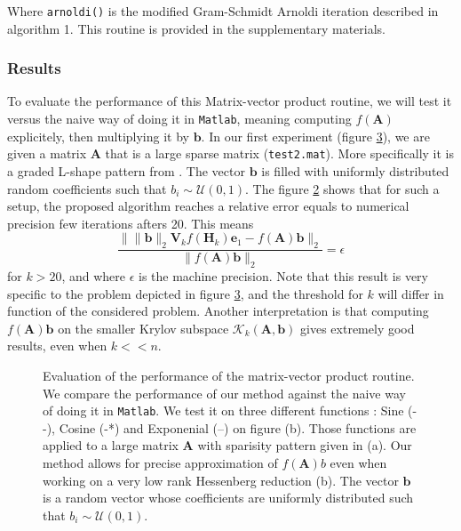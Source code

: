 \documentclass[11pt]{article}
\numberwithin{equation}{section}
\begin{document}
Where \texttt{arnoldi()} is the modified Gram-Schmidt Arnoldi iteration described in algorithm 1. This routine is provided in the supplementary materials.

\subsubsection{Results}
To evaluate the performance of this Matrix-vector product routine, we will test it versus the naive way of doing it in \texttt{Matlab}, meaning computing $f(\mathbf{A})$ explicitely, then multiplying it by $\mathbf{b}$. In our first experiment (figure \ref{fig:comp_fab}), we are given a matrix $\mathbf{A}$ that is a large sparse matrix (\texttt{test2.mat}). More specifically it is a graded L-shape pattern from \cite{george1978automatic}. The vector $\mathbf{b}$ is filled with uniformly distributed random coefficients such that $b_i\sim\mathcal{U}(0,1)$. The figure \ref{fig:comp_fab_assignement} shows that for such a setup, the proposed algorithm reaches a relative error equals to numerical precision few iterations afters 20. This means 
\begin{equation*}
    \frac{\|\|\mathbf{b}\|_2\mathbf{V}_k f(\mathbf{H}_k)\mathbf{e}_1 - f(\mathbf{A})\mathbf{b}\|_2}{\|f(\mathbf{A})\mathbf{b}\|_2} = \epsilon
\end{equation*}
for $k > 20$, and where $\epsilon$ is the machine precision. Note that this result is very specific to the problem depicted in figure \ref{fig:comp_fab}, and the threshold for $k$ will differ in function of the considered problem. Another interpretation is that computing $f(\mathbf{A})\mathbf{b}$ on the smaller Krylov subspace $\mathcal{K}_k(\mathbf{A},\mathbf{b})$ gives extremely good results, even when $k << n$. 
\begin{figure}
    \begin{subfigure}[b]{.45\linewidth}
        
        \caption{}
        \label{fig:comp_fab_pattern}
    \end{subfigure}
    \begin{subfigure}[b]{.45\linewidth}
        
        \caption{}
        \label{fig:comp_fab_assignement}
    \end{subfigure}
    \caption{Evaluation of the performance of the matrix-vector product routine. We compare the performance of our method against the naive way of doing it in \texttt{Matlab}. We test it on three different functions : Sine (- -), Cosine (-*) and Exponenial (--) on figure (b). Those functions are applied to a large matrix $\mathbf{A}$ with sparisity pattern given in (a). Our method allows for precise approximation of $f(\mathbf{A})b$ even when working on a very low rank Hessenberg reduction (b). The vector $\mathbf{b}$ is a random vector whose coefficients are uniformly distributed such that $b_i\sim\mathcal{U}(0,1)$.}
    \label{fig:comp_fab}
\end{figure}
\end{document}
